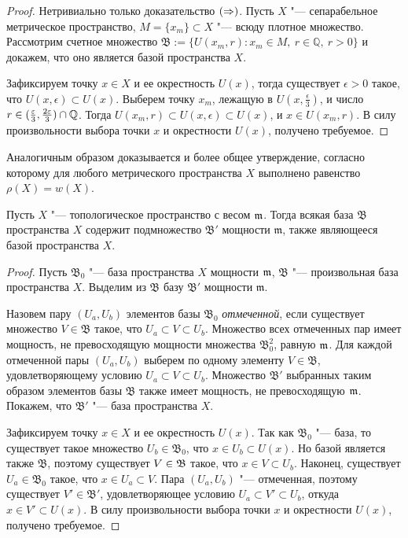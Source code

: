\begin{proof}
    Нетривиально только доказательство $(\Rightarrow)$. Пусть $X$ "--- сепарабельное метрическое пространство, $M = \{x_m\} \subset X$ "--- всюду плотное множество. Рассмотрим счетное множество $\mathfrak{B} := \{U(x_m, r): x_m\in M,~r \in\mathbb{Q},~r>0\}$ и докажем, что оно является базой пространства $X$.
    
    Зафиксируем точку $x \in X$ и ее окрестность $U(x)$, тогда существует $\epsilon > 0$ такое, что $U(x, \epsilon) \subset U(x)$. Выберем точку $x_m$, лежащую в $U(x, \frac{\epsilon}{3})$, и число $r \in (\frac{\varepsilon}{3}, \frac{2\varepsilon}{3}) \cap \mathbb{Q}$. Тогда $U(x_m, r) \subset U(x, \epsilon) \subset U(x)$, и $x \in U(x_m, r)$. В силу произвольности выбора точки $x$ и окрестности $U(x)$, получено требуемое.
\end{proof}

\begin{note}
    Аналогичным образом доказывается и более общее утверждение, согласно которому для любого метрического пространства $X$ выполнено равенство $\rho(X) = w(X)$.
\end{note}

\begin{theorem}\label{thmalexandrovurysohn}
    Пусть $X$ "--- топологическое пространство с весом $\mathfrak m$. Тогда всякая база $\mathfrak{B}$ пространства $X$ содержит подмножество $\mathfrak{B}'$ мощности $\mathfrak{m}$, также являющееся базой пространства $X$.
\end{theorem}

\begin{proof}
Пусть $\mathfrak{B}_0$ "--- база пространства $X$ мощности $\mathfrak m$, $\mathfrak{B}$ "--- произвольная база пространства $X$. Выделим из $\mathfrak{B}$ базу $\mathfrak{B}'$ мощности $\mathfrak{m}$.

Назовем пару $(U_a, U_b)$ элементов базы $\mathfrak{B}_0$ \textit{отмеченной}, если существует множество $V \in \mathfrak{B}$ такое, что $U_a\subset V\subset U_b$. Множество всех отмеченных пар имеет мощность, не превосходящую мощности множества $\mathfrak{B}_0^2$, равную $\mathfrak m$. Для каждой отмеченной пары $(U_a, U_b)$ выберем по одному элементу $V \in \mathfrak{B}$, удовлетворяющему условию $U_a \subset V \subset U_b$. Множество $\mathfrak{B}'$ выбранных таким образом элементов базы $\mathfrak{B}$ также имеет мощность, не превосходящую $\mathfrak{m}$. Покажем, что $\mathfrak{B}'$ "--- база пространства $X$.

Зафиксируем точку $x\in X$ и ее окрестность $U(x)$. Так как $\mathfrak{B}_0$ "--- база, то существует такое множество $U_b \in \mathfrak{B}_0$, что $x \in U_b \subset U(x)$. Но базой является также $\mathfrak{B}$, поэтому существует $V \in \mathfrak B$ такое, что $x \in V \subset U_b$. Наконец, существует $U_a \in \mathfrak{B}_0$ такое, что $x \in U_a \subset V$. Пара $(U_a, U_b)$ "--- отмеченная, поэтому существует $V' \in \mathfrak{B}'$, удовлетворяющее условию $U_a \subset V' \subset U_b$, откуда $x \in V' \subset U(x)$. В силу произвольности выбора точки $x$ и окрестности $U(x)$, получено требуемое.
\end{proof}

